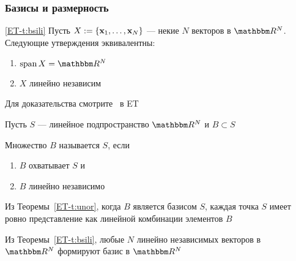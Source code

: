 \begin{frame}\frametitle{Базисы и размерность}

    \vspace{2em}
    \Thm\eqref{ET-t:bsili}
        Пусть $X := \{ {\mathbf x}_1, \ldots, {\mathbf x}_N \}$ --- некие $N$ векторов в $\RR^N$.
        Следующие утверждения эквивалентны:
        \begin{enumerate}
            \item $\Span X = \RR^N$
            \item $X$ линейно независим
        \end{enumerate}
    
    \vspace{.7em}
    Для доказательства смотрите~\pageref{ET-t:bsili} в ET
    
\end{frame}

\begin{frame}

    \vspace{2em}
    Пусть $S$ --- линейное подпространство $\RR^N$ и $B \subset S$
    
    \vspace{.7em}
    Множество $B$ называется  $S$, если
    \begin{enumerate}
        \item $B$ охватывает $S$ и
        \item $B$ линейно независимо
    \end{enumerate}
    
    \vspace{.7em}
    
\end{frame}

\begin{frame}
    
    \vspace{2em}
    Из Теоремы~\ref{ET-t:unor}, когда
    $B$ является базисом $S$, каждая точка $S$ имеет ровно представление
    как линейной комбинации элементов $B$
    
    \vspace{.7em}
    Из Теоремы~\ref{ET-t:bsili}, любые $N$ линейно
    независимых векторов в $\RR^N$ формируют базис в $\RR^N$
    
\end{frame}

